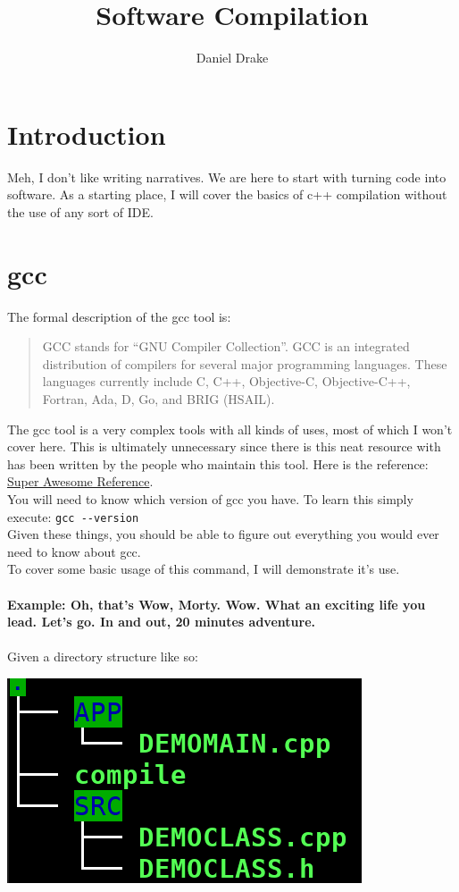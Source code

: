 \documentclass[12pt]{extarticle}
\title{Software Compilation}
\author{Daniel Drake}
\theoremstyle{plain}
\theoremstyle{plain}
\theoremstyle{plain}
\theoremstyle{Definition}
\theoremstyle{Definition}
\theoremstyle{plain}
\theoremstyle{plain}
\begin{document}
	
	\section{Introduction}
		Meh, I don't like writing narratives. We are here to start with turning code into software. As a starting place, I will cover the basics of c++ compilation without the use of any sort of IDE. 
	\section{gcc}
		The formal description of the gcc tool is:
		\begin{quotation}
			GCC stands for “GNU Compiler Collection”. GCC is an integrated distribution of compilers for several major programming languages. These languages currently include C, C++, Objective-C, Objective-C++, Fortran, Ada, D, Go, and BRIG (HSAIL). 
		\end{quotation}
		The gcc tool is a very complex tools with all kinds of uses, most of which I won't cover here. This is ultimately unnecessary since there is this neat resource with has been written by the people who maintain this tool. Here is the reference: \href{https://gcc.gnu.org/onlinedocs/}{Super Awesome Reference}. \\
		You will need to know which version of gcc you have. To learn this simply execute: 
		\verb|gcc --version| \\
		Given these things, you should be able to figure out everything you would ever need to know about gcc. \\
		To cover some basic usage of this command, I will demonstrate it's use. \\ \\
	\textbf{Example: Oh, that’s Wow, Morty. Wow. What an exciting life you lead. Let’s go. In and out, 20 minutes adventure. } \\ \\
		Given a directory structure like so: \\ 
		\begin{center}	
			\includegraphics{demo.png}			
		\end{center}		
\end{document}
